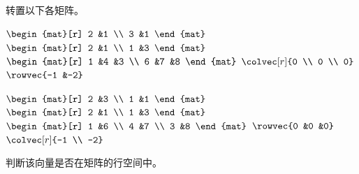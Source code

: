 \begin{exercises}
  \item
    转置以下各矩阵。
    \begin{exparts*}
      \partsitem \( \begin{mat}[r]
                 2  &1  \\
                 3  &1
               \end{mat}  \)
      \partsitem \( \begin{mat}[r]
                 2  &1  \\
                 1  &3
               \end{mat}  \)
      \partsitem \( \begin{mat}[r]
                 1  &4  &3 \\
                 6  &7  &8
               \end{mat}  \)
      \partsitem \( \colvec[r]{0 \\ 0 \\ 0} \)
      \partsitem \( \rowvec{-1 &-2} \)
    \end{exparts*}
    \begin{answer}
      \begin{exparts*}
        \partsitem \( \begin{mat}[r]
                   2  &3  \\
                   1  &1
                 \end{mat}  \)
        \partsitem \( \begin{mat}[r]
                   2  &1  \\
                   1  &3
                 \end{mat}  \)
        \partsitem \( \begin{mat}[r]
                   1  &6  \\
                   4  &7  \\
                   3  &8
                 \end{mat}  \)
        \partsitem \( \rowvec{0 &0 &0} \)
        \partsitem \( \colvec[r]{-1 \\ -2} \)
      \end{exparts*}
    \end{answer}
  \recommended \item
    判断该向量是否在矩阵的行空间中。
\end{exercises}
